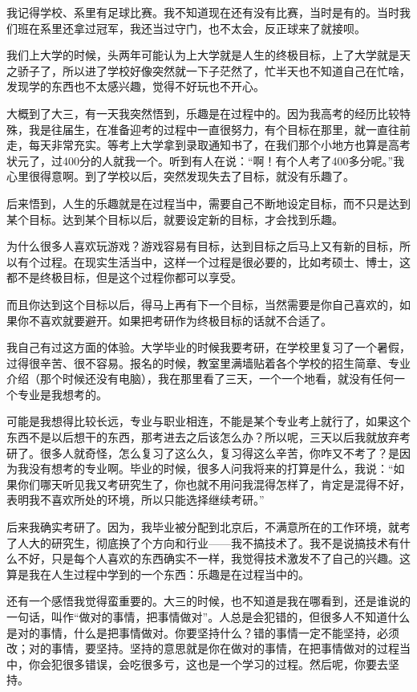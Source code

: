 我记得学校、系里有足球比赛。我不知道现在还有没有比赛，当时是有的。当时我们班在系里还拿过冠军，我还当过守门，也不太会，反正球来了就接呗。


我们上大学的时候，头两年可能认为上大学就是人生的终极目标，上了大学就是天之骄子了，所以进了学校好像突然就一下子茫然了，忙半天也不知道自己在忙啥，发现学的东西也不太感兴趣，觉得不好玩也不开心。

大概到了大三，有一天我突然悟到，乐趣是在过程中的。因为我高考的经历比较特殊，我是往届生，在准备迎考的过程中一直很努力，有个目标在那里，就一直往前走，每天非常充实。等考上大学拿到录取通知书了，在我们那个小地方也算是高考状元了，过400分的人就我一个。听到有人在说：“啊！有个人考了400多分呢。”我心里很得意啊。到了学校以后，突然发现失去了目标，就没有乐趣了。

后来悟到，人生的乐趣就是在过程当中，需要自己不断地设定目标，而不只是达到某个目标。达到某个目标以后，就要设定新的目标，才会找到乐趣。

为什么很多人喜欢玩游戏？游戏容易有目标，达到目标之后马上又有新的目标，所以有个过程。在现实生活当中，这样一个过程是很必要的，比如考硕士、博士，这都不是终极目标，但是这个过程你都可以享受。

而且你达到这个目标以后，得马上再有下一个目标，当然需要是你自己喜欢的，如果你不喜欢就要避开。如果把考研作为终极目标的话就不合适了。

我自己有过这方面的体验。大学毕业的时候我要考研，在学校里复习了一个暑假，过得很辛苦、很不容易。报名的时候，教室里满墙贴着各个学校的招生简章、专业介绍（那个时候还没有电脑），我在那里看了三天，一个一个地看，就没有任何一个专业是我想考的。

可能是我想得比较长远，专业与职业相连，不能是某个专业考上就行了，如果这个东西不是以后想干的东西，那考进去之后该怎么办？所以呢，三天以后我就放弃考研了。很多人就奇怪，怎么复习了这么久，复习得这么辛苦，你咋又不考了？是因为我没有想考的专业啊。毕业的时候，很多人问我将来的打算是什么，我说：“如果你们哪天听见我又考研究生了，你也就不用问我混得怎样了，肯定是混得不好，表明我不喜欢所处的环境，所以只能选择继续考研。”

后来我确实考研了。因为，我毕业被分配到北京后，不满意所在的工作环境，就考了人大的研究生，彻底换了个方向和行业——我不搞技术了。我不是说搞技术有什么不好，只是每个人喜欢的东西确实不一样，我觉得技术激发不了自己的兴趣。这算是我在人生过程中学到的一个东西：乐趣是在过程当中的。

还有一个感悟我觉得蛮重要的。大三的时候，也不知道是我在哪看到，还是谁说的一句话，叫作“做对的事情，把事情做对”。人总是会犯错的，但很多人不知道什么是对的事情，什么是把事情做对。你要坚持什么？错的事情一定不能坚持，必须改；对的事情，要坚持。坚持的意思就是你在做对的事情，在把事情做对的过程当中，你会犯很多错误，会吃很多亏，这也是一个学习的过程。然后呢，你要去坚持。

